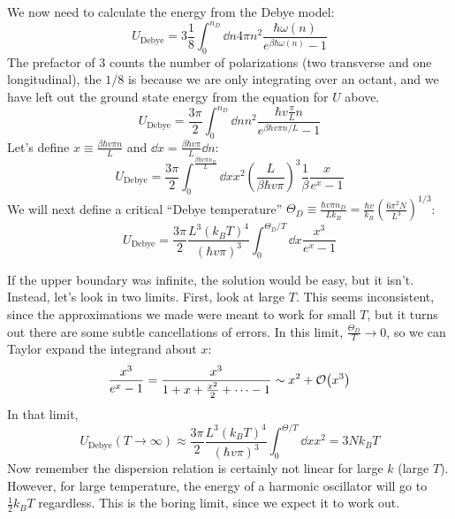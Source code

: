 \documentclass[a4paper,twoside,master.tex]{subfiles}
\begin{document}

We now need to calculate the energy from the Debye model:
\begin{equation}
    U_{\text{Debye}} = 3 \frac{1}{8} \int_0^{n_D} \dd{n} 4 \pi n^2 \frac{\hbar \omega(n)}{e^{\beta \hbar \omega(n)} - 1}
\end{equation}
The prefactor of $ 3 $ counts the number of polarizations (two transverse and one longitudinal), the $ 1/8 $ is because we are only integrating over an octant, and we have left out the ground state energy from the equation for $ U $ above.
\begin{equation}
    U_{\text{Debye}} = \frac{3 \pi}{2} \int_0^{n_D} \dd{n} n^2 \frac{\hbar v \frac{\pi}{L} n}{e^{\beta \hbar v \pi n / L} - 1}
\end{equation}
Let's define $ x \equiv \frac{\beta \hbar v \pi n}{L} $ and $ \dd{x} = \frac{\beta \hbar v \pi}{L} \dd{n} $:
\begin{equation}
    U_{\text{Debye}} = \frac{3 \pi}{2} \int_0^{\frac{\beta \hbar v \pi n_D}{L}} \dd{x} x^2 \left( \frac{L}{\beta \hbar v \pi} \right)^3 \frac{1}{\beta} \frac{x}{e^x - 1}
\end{equation}
We will next define a critical ``Debye temperature'' $ \Theta_D \equiv \frac{\hbar v \pi n_D}{L k_B} = \frac{\hbar v}{k_B} \left( \frac{6 \pi^2 N}{L^3} \right)^{1/3} $:
\begin{equation}
U_{\text{Debye}} = \frac{3 \pi}{2} \frac{L^3 (k_B T)^4}{(\hbar v \pi)^3} \int_0^{\Theta_D / T} \dd{x} \frac{x^3}{e^x - 1}
\end{equation}

If the upper boundary was infinite, the solution would be easy, but it isn't. Instead, let's look in two limits. First, look at large $ T $. This seems inconsistent, since the approximations we made were meant to work for small $ T $, but it turns out there are some subtle cancellations of errors. In this limit, $ \frac{\Theta_D}{T} \to 0 $, so we can Taylor expand the integrand about $ x $:
\begin{equation}
    \frac{x^3}{e^x - 1} = \frac{x^3}{1 + x + \frac{x^2}{2} + \cdots - 1} \sim x^2 + \order{x^3}
\end{equation}
In that limit,
\begin{equation}
    U_{\text{Debye}} (T \to \infty) \approx \frac{3 \pi}{2} \frac{L^3 (k_B T)^4}{(\hbar v \pi)^3} \int_0^{\Theta / T} \dd{x} x^2 = 3 N k_B T
\end{equation}
Now remember the dispersion relation is certainly not linear for large $ k $ (large $ T $). However, for large temperature, the energy of a harmonic oscillator will go to $ \frac{1}{2} k_B T $ regardless. This is the boring limit, since we expect it to work out.
\end{document}
